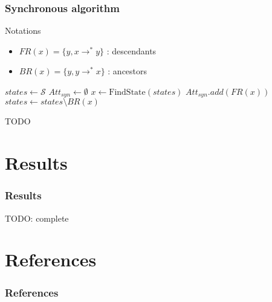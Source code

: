\documentclass{beamer}
\begin{document}
\begin{frame}
  \frametitle{Synchronous algorithm}
  
  \begin{block}{Notations}
    \begin{itemize}
    \item $FR(x) = \{ y,  x \rightarrow^* y \}$ : descendants 
    \item $BR(x) = \{ y, y \rightarrow^* x \} $ : ancestors
    \end{itemize}
  \end{block}
  
  \bigskip
  \begin{algorithmic}
    \State $states \gets \mathcal S$
    \State $Att_{syn} \gets \emptyset$
      \State $x \gets \text{FindState}(states)$
      \State $Att_{syn}.add(FR(x))$
      \State $states \gets states \setminus BR(x)$
    \EndWhile
  \end{algorithmic}
  
\end{frame}

\begin{frame}
\end{frame}

\begin{frame}
  TODO
\end{frame}



\section{Results}

\begin{frame}
  \frametitle{Results}
  TODO: complete
\end{frame}


\section*{References}

\begin{frame}
  \frametitle{References}
  
  
\end{frame}
\end{document}
